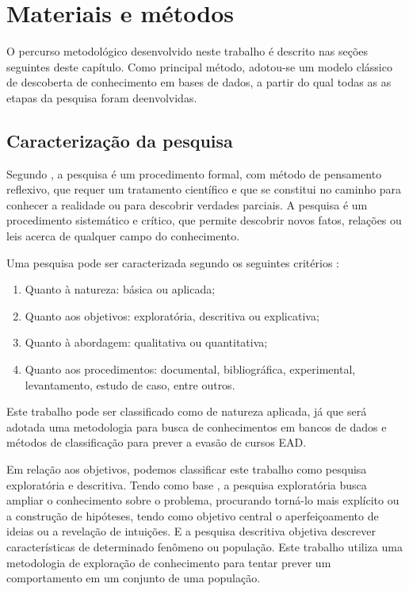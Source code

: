\chapter{Materiais e métodos} \label{metodos}

O percurso metodológico desenvolvido neste trabalho é descrito nas seções
seguintes deste capítulo. Como principal método, adotou-se um modelo clássico de
descoberta de conhecimento em bases de dados, a partir do qual todas as as
etapas da pesquisa foram deenvolvidas.

\section{Caracterização da pesquisa}

Segundo , a pesquisa é um procedimento
formal, com método de pensamento reflexivo, que requer um tratamento científico
e que se constitui no caminho para conhecer a realidade ou para descobrir
verdades parciais. A pesquisa é um procedimento sistemático e crítico,  que
permite descobrir novos fatos, relações ou leis acerca de qualquer campo do
conhecimento.

Uma pesquisa pode ser caracterizada segundo os seguintes critérios
\cite{gil2008metodos}:
\begin{enumerate}[label=\alph*)]
  \item Quanto à natureza: básica ou aplicada;
  \item Quanto aos objetivos: exploratória, descritiva ou explicativa;
  \item Quanto à abordagem: qualitativa ou quantitativa;
  \item Quanto aos procedimentos: documental, bibliográfica, experimental,
  levantamento, estudo de caso, entre outros.
\end{enumerate}

Este trabalho pode ser classificado como de natureza aplicada, já que será
adotada uma metodologia para busca de conhecimentos em bancos de dados e métodos
de classificação para prever a evasão de cursos EAD.

Em relação aos objetivos, podemos classificar este trabalho como pesquisa
exploratória e descritiva. Tendo como base , a
pesquisa exploratória busca ampliar o conhecimento sobre o problema, procurando
torná-lo mais explícito ou a construção de hipóteses, tendo como objetivo
central o aperfeiçoamento de ideias ou a revelação de intuições. E a pesquisa
descritiva objetiva descrever características de determinado fenômeno ou
população. Este trabalho utiliza uma metodologia de exploração de conhecimento
para tentar prever um comportamento em um conjunto de uma população.

